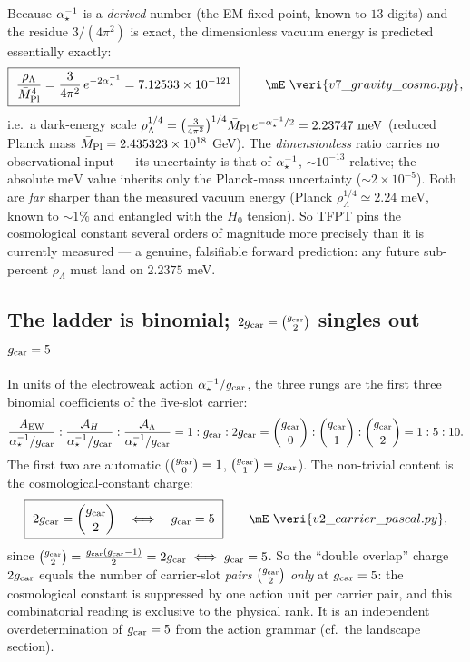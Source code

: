 \begin{winbox}
Because $\alpha^{-1}_\star$ is a \emph{derived} number (the EM fixed point, known to $13$ digits) and the residue
$3/(4\pi^2)$ is exact, the dimensionless vacuum energy is predicted essentially exactly:
\begin{equation}
  \boxed{\ \frac{\rho_\Lambda}{\Mbar^4}=\frac{3}{4\pi^2}\,e^{-2\ainv}=7.12533\times10^{-121}\ }\qquad\mE\ \veri{v7\_gravity\_cosmo.py} ,
\end{equation}
i.e.\ a dark-energy scale
$\rho_\Lambda^{1/4}=\bigl(\tfrac{3}{4\pi^2}\bigr)^{1/4}\Mbar\,e^{-\ainv/2}=2.23747\ \mathrm{meV}$
(reduced Planck mass $\bar M_{\mathrm{Pl}}=2.435323\times10^{18}$ GeV). The \emph{dimensionless} ratio carries no
observational input --- its uncertainty is that of $\alpha^{-1}_\star$, $\sim10^{-13}$ relative; the absolute
$\mathrm{meV}$ value inherits only the Planck-mass uncertainty ($\sim2\times10^{-5}$). Both are
\emph{far} sharper than the measured vacuum energy (Planck $\rho_\Lambda^{1/4}\simeq2.24$ meV, known to
$\sim1\%$ and entangled with the $H_0$ tension). So TFPT pins the cosmological constant several orders of
magnitude more precisely than it is currently measured --- a genuine, falsifiable forward prediction:
any future sub-percent $\rho_\Lambda$ must land on $2.2375$ meV.
\end{winbox}

\subsection{The ladder is binomial; $2g_{\mathrm{car}}=\binom{g_{\mathrm{car}}}{2}$ singles out $g_{\mathrm{car}}=5$}

In units of the electroweak action $\alpha^{-1}_\star/g_{\mathrm{car}}$, the three rungs are the first three binomial
coefficients of the five-slot carrier:
\begin{equation}
  \frac{A_{\mathrm{EW}}}{\alpha^{-1}_\star/g_{\mathrm{car}}}:\frac{\mathcal A_H}{\alpha^{-1}_\star/g_{\mathrm{car}}}:\frac{\mathcal A_\Lambda}{\alpha^{-1}_\star/g_{\mathrm{car}}}
  =1:g_{\mathrm{car}}:2g_{\mathrm{car}}
  =\binom{g_{\mathrm{car}}}{0}:\binom{g_{\mathrm{car}}}{1}:\binom{g_{\mathrm{car}}}{2}
  =1:5:10 .
\end{equation}
The first two are automatic ($\binom{g_{\mathrm{car}}}{0}=1$, $\binom{g_{\mathrm{car}}}{1}=g_{\mathrm{car}}$). The non-trivial content
is the cosmological-constant charge:
\begin{equation}
  \boxed{\ 2\gcar=\binom{\gcar}{2}\quad\Longleftrightarrow\quad \gcar=5\ }\qquad\mE\ \veri{v2\_carrier\_pascal.py},
\end{equation}
since $\binom{g_{\mathrm{car}}}{2}=\tfrac{g_{\mathrm{car}}(g_{\mathrm{car}}-1)}{2}=2g_{\mathrm{car}}\iff g_{\mathrm{car}}=5$. So the ``double overlap'' charge
$2g_{\mathrm{car}}$ equals the number of carrier-slot \emph{pairs} $\binom{g_{\mathrm{car}}}{2}$ \emph{only} at $g_{\mathrm{car}}=5$:
the cosmological constant is suppressed by one action unit per carrier pair, and this combinatorial
reading is exclusive to the physical rank. It is an independent overdetermination of $g_{\mathrm{car}}=5$ from
the action grammar (cf.\ the landscape section).


